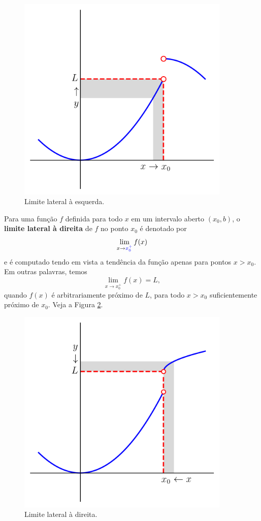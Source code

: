 \begin{figure}[H]
  \centering
  \includegraphics[width=4in]{./cap_lim/dados/fig_lim_esq/fig.png}
  \caption{Limite lateral à esquerda.}
  \label{fig:lim_esq}
\end{figure}

Para uma função $f$ definida para todo $x$ em um intervalo aberto $(x_0, b)$, o {\bf limite lateral à direita} de $f$ no ponto $x_0$ é denotado por
\begin{equation}
  \lim_{x\to {\color{blue}x_0^+}} f(x)
\end{equation}
e é computado tendo em vista a tendência da função apenas para pontos $x>x_0$. Em outras palavras, temos
\begin{equation}
  \lim_{x\to x_0^+} f(x) = L,
\end{equation}
quando $f(x)$ é arbitrariamente próximo de $L$, para todo $x>x_0$ suficientemente próximo de $x_0$. Veja a Figura \ref{fig:lim_dir}.

\begin{figure}[H]
  \centering
  \includegraphics[width=4in]{./cap_lim/dados/fig_lim_dir/fig.png}
  \caption{Limite lateral à direita.}
  \label{fig:lim_dir}
\end{figure}

